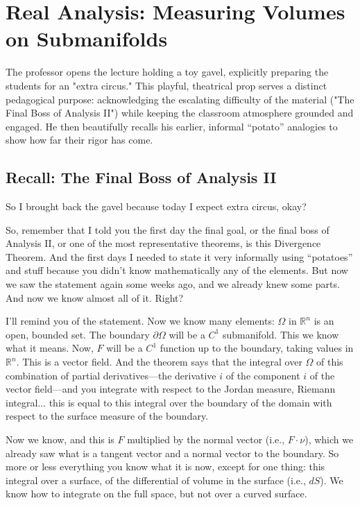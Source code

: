\chapter{Real Analysis: Measuring Volumes on Submanifolds}

\begin{didactic-insight}
The professor opens the lecture holding a toy gavel, explicitly preparing the students for an "extra circus." This playful, theatrical prop serves a distinct pedagogical purpose: acknowledging the escalating difficulty of the material ("The Final Boss of Analysis II") while keeping the classroom atmosphere grounded and engaged. He then beautifully recalls his earlier, informal ``potato'' analogies to show how far their rigor has come.
\end{didactic-insight}


\section{Recall: The Final Boss of Analysis II}

\begin{spoken-clean}[00:00:00 - 00:01:28]
So I brought back the gavel because today I expect extra circus, okay? 

So, remember that I told you the first day the final goal, or the final boss of Analysis II, or one of the most representative theorems, is this Divergence Theorem. And the first days I needed to state it very informally using ``potatoes'' and stuff because you didn't know mathematically any of the elements. But now we saw the statement again some weeks ago, and we already knew some parts. And now we know almost all of it. Right? 

I'll remind you of the statement. Now we know many elements: $\Omega$ in $\mathbb{R}^n$ is an open, bounded set. The boundary $\partial \Omega$ will be a $C^1$ submanifold. This we know what it means. Now, $F$ will be a $C^1$ function up to the boundary, taking values in $\mathbb{R}^n$. This is a vector field. And the theorem says that the integral over $\Omega$ of this combination of partial derivatives—the derivative $i$ of the component $i$ of the vector field—and you integrate with respect to the Jordan measure, Riemann integral... this is equal to this integral over the boundary of the domain with respect to the surface measure of the boundary. 

Now we know, and this is $F$ multiplied by the normal vector (i.e., $F \cdot \nu$), which we already saw what is a tangent vector and a normal vector to the boundary. So more or less everything you know what it is now, except for one thing: this integral over a surface, of the differential of volume in the surface (i.e., $dS$). We know how to integrate on the full space, but not over a curved surface.
\end{spoken-clean}

